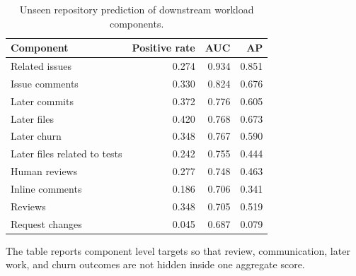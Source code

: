 \begin{table}[t]
\centering
\scriptsize
\caption{Unseen repository prediction of downstream workload components.}
\label{tab:aidev-components}
\begin{tabular}{lrrr}
\toprule
Component & Positive rate & AUC & AP \\
\midrule
Related issues & 0.274 & 0.934 & 0.851 \\
Issue comments & 0.330 & 0.824 & 0.676 \\
Later commits & 0.372 & 0.776 & 0.605 \\
Later files & 0.420 & 0.768 & 0.673 \\
Later churn & 0.348 & 0.767 & 0.590 \\
Later files related to tests & 0.242 & 0.755 & 0.444 \\
Human reviews & 0.277 & 0.748 & 0.463 \\
Inline comments & 0.186 & 0.706 & 0.341 \\
Reviews & 0.348 & 0.705 & 0.519 \\
Request changes & 0.045 & 0.687 & 0.079 \\
\bottomrule
\end{tabular}
\par\footnotesize{The table reports component level targets so that review, communication, later work, and churn outcomes are not hidden inside one aggregate score.}
\end{table}
